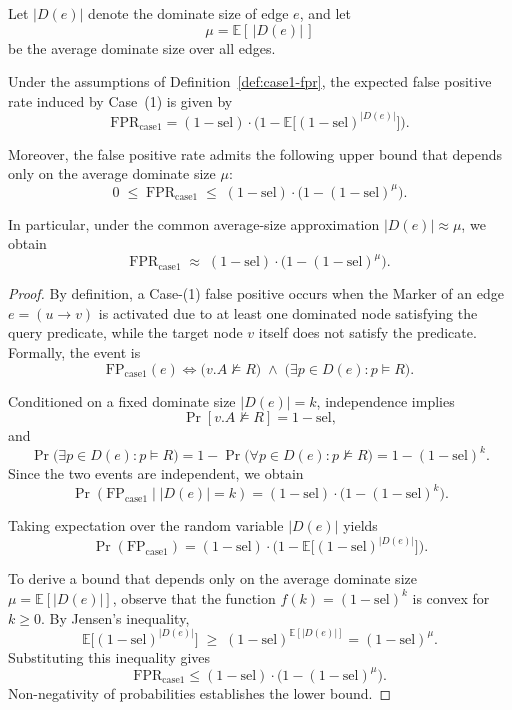 \begin{theorem}
\label{thm:case1}
Let $|D(e)|$ denote the dominate size of edge $e$, and let
\[
\mu = \mathbb{E}[\,|D(e)|\,]
\]
be the average dominate size over all edges.

Under the assumptions of Definition~\ref{def:case1-fpr}, the expected false positive rate induced by Case~(1) is given by
\[
\mathrm{FPR}_{\mathrm{case1}}
=
(1-\mathrm{sel}) \cdot
\Big(1 - \mathbb{E}\big[(1-\mathrm{sel})^{|D(e)|}\big]\Big).
\]

Moreover, the false positive rate admits the following upper bound that depends only on the average dominate size $\mu$:
\[
0
\;\le\;
\mathrm{FPR}_{\mathrm{case1}}
\;\le\;
(1-\mathrm{sel}) \cdot \big(1-(1-\mathrm{sel})^{\mu}\big).
\]

In particular, under the common average-size approximation $|D(e)| \approx \mu$, we obtain
\[
\mathrm{FPR}_{\mathrm{case1}}
\;\approx\;
(1-\mathrm{sel}) \cdot \big(1-(1-\mathrm{sel})^{\mu}\big).
\]
\end{theorem}


\begin{proof}
By definition, a Case-(1) false positive occurs when the Marker of an edge $e=(u\!\to\!v)$ is activated due to at least one dominated node satisfying the query predicate, while the target node $v$ itself does not satisfy the predicate. Formally, the event is
\[
\mathrm{FP}_{\mathrm{case1}}(e)
\iff
\big(v.A \not\models R\big)
\;\wedge\;
\Big(\exists p \in D(e): p \models R\Big).
\]

Conditioned on a fixed dominate size $|D(e)| = k$, independence implies
\[
\Pr[v.A \not\models R] = 1-\mathrm{sel},
\]
and
\[
\Pr\big(\exists p \in D(e): p \models R\big)
= 1 - \Pr\big(\forall p \in D(e): p \not\models R\big)
= 1 - (1-\mathrm{sel})^{k}.
\]
Since the two events are independent, we obtain
\[
\Pr(\mathrm{FP}_{\mathrm{case1}} \mid |D(e)|=k)
= (1-\mathrm{sel}) \cdot \big(1-(1-\mathrm{sel})^{k}\big).
\]

Taking expectation over the random variable $|D(e)|$ yields
\[
\Pr(\mathrm{FP}_{\mathrm{case1}})
= (1-\mathrm{sel}) \cdot
\Big(1 - \mathbb{E}\big[(1-\mathrm{sel})^{|D(e)|}\big]\Big).
\]

To derive a bound that depends only on the average dominate size
$\mu = \mathbb{E}[|D(e)|]$, observe that the function
$f(k) = (1-\mathrm{sel})^{k}$ is convex for $k \ge 0$.
By Jensen's inequality,
\[
\mathbb{E}\big[(1-\mathrm{sel})^{|D(e)|}\big]
\;\ge\;
(1-\mathrm{sel})^{\mathbb{E}[|D(e)|]}
=
(1-\mathrm{sel})^{\mu}.
\]
Substituting this inequality gives
\[
\mathrm{FPR}_{\mathrm{case1}}
\le
(1-\mathrm{sel}) \cdot \big(1-(1-\mathrm{sel})^{\mu}\big).
\]
Non-negativity of probabilities establishes the lower bound.
\end{proof}



